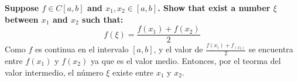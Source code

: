 \item \textbf{
    Suppose $f\in C[a,b]$ and $x_1,x_2 \in [a,b]$. Show that exist a number $\xi$ between $x_1$ and $x_2$ such that:
    \begin{equation*}
        f(\xi) = \frac{f(x_1)+f(x_2)}{2}
    \end{equation*}
}
Como $f$ es continua en el intervalo $[a,b]$, y el valor de $\frac{f(x_i)+f_(x_2)}{2}$ se encuentra entre $f(x_1)$ y $f(x_2)$ ya que es el valor medio. Entonces, por el teorma del valor intermedio, el número $\xi$ existe entre $x_1$ y $x_2$.
